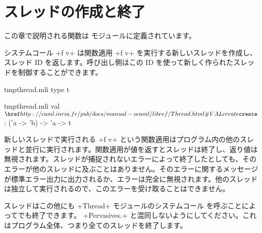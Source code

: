 \section{スレッドの作成と終了}

この章で説明される関数は  モジュールに定義されています。

システムコール  \ml+f v+ は関数適用 \ml+f v+ を実行する新しいスレッドを作成し、スレッド ID を返します。呼び出し側はこの ID を使って新しく作られたスレッドを制御することができます。
%
\begin{codefile}{tmpthread.mli}
type t
\end{codefile}
%
\begin{listingcodefile}{tmpthread.mli}
val $\libvalue{Thread}{create}$ : ('a -> 'b) -> 'a -> t
\end{listingcodefile}
%
新しいスレッドで実行される \ml+f v+ という関数適用はプログラム内の他のスレッドと並行に実行されます。関数適用が値を返すとスレッドは終了し、返り値は無視されます。スレッドが捕捉されないエラーによって終了したとしても、そのエラーが他のスレッドに及ぶことはありません。そのエラーに関するメッセージが標準エラー出力に出力されるか、エラーは完全に無視されます。他のスレッドは独立して実行されるので、このエラーを受け取ることはできません。

スレッドはこの他にも \ml+Thread+ モジュールのシステムコール  を呼ぶことによってでも終了できます。 \ml+Pervasives.+ と混同しないようにしてください。これはプログラム全体、つまり全てのスレッドを終了します。%

